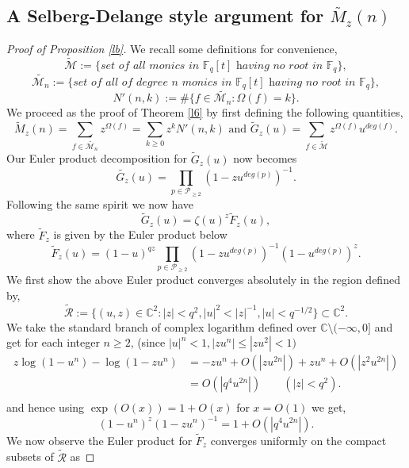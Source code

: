 \documentclass[12pt]{amsart}
\numberwithin{equation}{section}
\theoremstyle{remark}
\theoremstyle{remark}
\theoremstyle{definition}
\begin{document}
\subsection{A Selberg-Delange style argument for $\widetilde{M_z}(n)$}
\llll*
\begin{proof}[Proof of Proposition \ref{lb}]\label{lh}
\label{Proof of Proposition 1.4}
We recall some definitions for convenience,
$$\widetilde{\mathcal{M}}:=\bigg\{ \textit{set of all monics in } \mathbb{F}_q[t] \textit{ having no root in }\mathbb{F}_q\bigg \},$$
$$\widetilde{\mathcal{M}_n}:=\bigg\{ \textit{set of all of degree }n\textit{ monics in } \mathbb{F}_q[t] \textit{ having no root in }\mathbb{F}_q\bigg \},$$
$$N'(n,k):= \#\bigg \{f\in \widetilde{\mathcal{M}_n}:\Omega(f)=k \bigg \}.$$
We proceed as the proof of Theorem \ref{l6} by first defining the following quantities,
$$\widetilde{M}_z(n)=\displaystyle\sum\limits_{f\in\widetilde{\mathcal{M}_n}}z^{\Omega(f)}=\displaystyle\sum\limits_{k\geqslant 0} z^kN'(n,k) \text{    and   } \widetilde{G}_z(u)=\displaystyle\sum\limits_{f\in\widetilde{\mathcal{M}}}z^{\Omega(f)}u^{deg(f)}.$$
Our Euler product decomposition for $\widetilde{G}_z(u)$ now becomes
$$\widetilde{G_z}(u)=\displaystyle\prod_{p\in\mathcal{P}_{\geqslant 2}}\left(1-zu^{deg(p)}\right)^{-1}.$$
Following the same spirit we now have
$$\widetilde{G}_z(u)=\zeta(u)^z \widetilde{F}_z(u),$$
where $\widetilde{F}_z$ is given by the Euler product below
$$\widetilde{F}_z(u)=(1-u)^{qz}\displaystyle\prod\limits_{p\in\mathcal{P}_{\geqslant 2}}\left(1-zu^{deg(p)} \right)^{-1}\left(1-u^{deg(p)}\right)^z.$$
We first show the above Euler product converges absolutely in the region defined by,
$$\widetilde{\mathcal{R}}:=\Big \{(u,z)\in\mathbb{C}^2:|z|< q^2,|u|^2<|z|^{-1},|u|<q^{-1/2}\Big\}\subset\mathbb{C}^2.$$
We take the standard branch of complex logarithm defined over $\mathbb{C}\setminus(-\infty,0]$ and get for each integer $n\geqslant 2$, (since  $|u|^n<1 ,|zu^n|\leqslant |zu^2|<1)$
\begin{align}
\nonumber
z\log(1-u^n)-\log(1-zu^n)  &= -zu^n+O\left(\left|zu^{2n}\right|\right)+zu^n+O\left(\left|z^2u^{2n}\right|\right)\\
\nonumber
&= O\left(\left|q^4u^{2n}\right|\right)\qquad \left(|z|<q^2\right).\\
\end{align}
and hence using $\exp(O(x))=1+O(x)$ for $x=O(1)$ we get,
$$(1-u^n)^z(1-zu^n)^{-1}=1+O\left(\left|q^4u^{2n}\right|\right).$$
We now observe the Euler product for $\widetilde{F}_z$ converges uniformly on the compact subsets of $\widetilde{\mathcal{R}}$ as

\end{proof}
\end{document}
